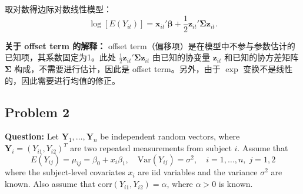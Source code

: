 取对数得边际对数线性模型：
\[
  \log[E(Y_{it})] = \boldsymbol{x}_{it}'\boldsymbol{\beta} + \frac{1}{2}\boldsymbol{z}_{it}'\boldsymbol{\Sigma}\boldsymbol{z}_{it}.
\]

\textbf{关于 offset term 的解释：} offset term（偏移项）是在模型中不参与参数估计的已知项，其系数固定为1。此处 $\frac{1}{2}\boldsymbol{z}_{it}'\boldsymbol{\Sigma}\boldsymbol{z}_{it}$ 由已知的协变量 $\boldsymbol{z}_{it}$ 和已知的协方差矩阵 $\boldsymbol{\Sigma}$ 构成，不需要进行估计，因此是 offset term。另外，由于 $\exp$ 变换不是线性的，因此需要进行均值的修正。


\subsection{Problem 2}

\textbf{Question:} Let $\boldsymbol{Y}_1, \ldots, \boldsymbol{Y}_n$ be independent random vectors, where $\boldsymbol{Y}_i = (Y_{i1}, Y_{i2})^T$ are two repeated measurements from subject $i$. Assume that
\[
  E(Y_{ij}) = \mu_{ij} = \beta_0 + x_i\beta_1, \quad \text{Var}(Y_{ij}) = \sigma^2, \quad i=1,\ldots,n,\; j=1,2
\]
where the subject-level covariates $x_i$ are iid variables and the variance $\sigma^2$ are known. Also assume that $\text{corr}(Y_{i1}, Y_{i2}) = \alpha$, where $\alpha > 0$ is known.

